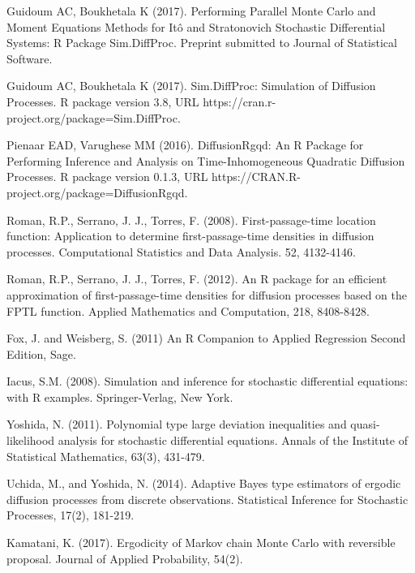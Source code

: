 \begin{thebibliography}{00}
Guidoum AC, Boukhetala K (2017). 
\newblock Performing Parallel Monte Carlo and Moment Equations Methods for Itô and Stratonovich Stochastic Differential Systems: R Package Sim.DiffProc. 
\newblock Preprint submitted to Journal of Statistical Software.

Guidoum AC, Boukhetala K (2017). 
\newblock Sim.DiffProc: Simulation of Diffusion Processes. 
\newblock R package version 3.8, URL https://cran.r-project.org/package=Sim.DiffProc.

Pienaar EAD, Varughese MM (2016). 
\newblock DiffusionRgqd: An R Package for Performing Inference and Analysis on Time-Inhomogeneous Quadratic Diffusion Processes. 
\newblock R package version 0.1.3, URL https://CRAN.R-project.org/package=DiffusionRgqd.

Roman, R.P., Serrano, J. J., Torres, F. (2008). 
\newblock First-passage-time location function: Application to determine first-passage-time densities in diffusion processes. 
\newblock Computational Statistics and Data Analysis. 52, 4132-4146.

Roman, R.P., Serrano, J. J., Torres, F. (2012). 
\newblock An R package for an efficient approximation of first-passage-time densities for diffusion processes based on the FPTL function. 
\newblock Applied Mathematics and Computation, 218, 8408-8428.

Fox, J. and Weisberg, S. (2011) 
\newblock An R Companion to Applied Regression
\newblock Second Edition, Sage.

Iacus, S.M. (2008). 
\newblock Simulation and inference for stochastic differential equations: with R examples. 
\newblock Springer-Verlag, New York.
		
Yoshida, N. (2011). 
\newblock Polynomial type large deviation inequalities and quasi-likelihood analysis for stochastic differential equations. 
\newblock Annals of the Institute of Statistical Mathematics, 63(3), 431-479.

Uchida, M., and Yoshida, N. (2014). 
\newblock Adaptive Bayes type estimators of ergodic diffusion processes from discrete observations. 
\newblock Statistical Inference for Stochastic Processes, 17(2), 181-219.

Kamatani, K. (2017).
\newblock Ergodicity of Markov chain Monte Carlo with reversible proposal. 
\newblock Journal of Applied Probability, 54(2).
	

\end{thebibliography}

